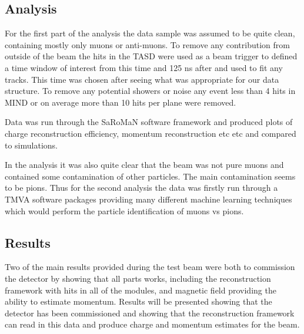 \subsection{Analysis}

For the first part of the analysis the data sample was assumed to be quite clean, containing mostly only muons or anti-muons. To remove any contribution from outside of the beam the hits in the TASD were used as a beam trigger to defined a time window of  interest from this time and 125 ns after and used to fit any tracks. This time was chosen after seeing what was appropriate for our data structure. To remove any potential showers or noise any event less than 4 hits in MIND or on average more than 10 hits per plane were removed.

Data was run through the SaRoMaN software framework and produced plots of charge reconstruction efficiency, momentum reconstruction etc etc and compared to simulations.

In the analysis it was also quite clear that the beam was not pure muons and contained some contamination of other particles. The main contamination seems to be pions. Thus for the second analysis the data was firstly run through a TMVA software packages providing many different machine learning techniques which would perform the particle identification of muons vs pions.








\subsection{Results}
Two of the main results provided during the test beam were both to commission the detector by showing that all parts works, including the reconstruction framework with hits in all of the modules, and magnetic field providing the ability to estimate momentum. Results will be presented showing that the detector has been commissioned and showing that the reconstruction framework can read in this data and produce charge and momentum estimates for the beam.

